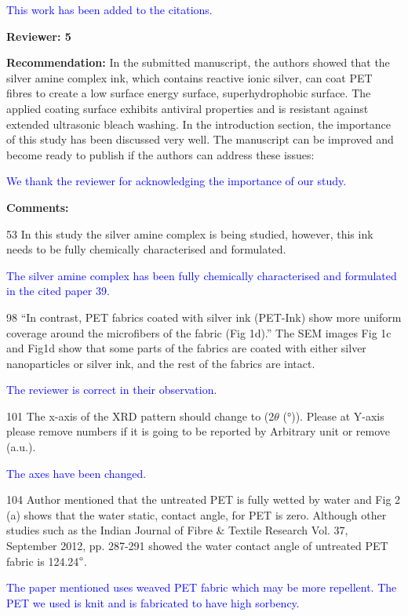 \documentclass[12pt]{letter}
\newcommand{\blue}[1]{\textcolor{blue}{#1}} %
\begin{document}
\blue{This work has been added to the citations. }

\newpage
\textbf{Reviewer: 5}

\textbf{Recommendation:}
In the submitted manuscript, the authors showed that the silver amine complex ink, which contains reactive ionic silver, can coat PET fibres to create a low surface energy surface, superhydrophobic surface. The applied coating surface exhibits antiviral properties and is resistant against extended ultrasonic bleach washing. In the introduction section, the importance of this study has been discussed very well. The manuscript can be improved and become ready to publish if the authors can address these issues:

\blue{We thank the reviewer for acknowledging the importance of our study.}

\textbf{Comments:} 

53 In this study the silver amine complex is being studied, however, this ink needs to be fully chemically characterised and formulated.

\blue{The silver amine complex has been fully chemically characterised and formulated in the cited paper 39.}  %

98 “In contrast, PET fabrics coated with silver ink (PET-Ink) show more uniform coverage around the microfibers of the fabric (Fig 1d).”
The SEM images Fig 1c and Fig1d show that some parts of the fabrics are coated with either silver nanoparticles or silver ink, and the rest of the fabrics are intact.

\blue{The reviewer is correct in their observation.}

101 The x-axis of the XRD pattern should change to (2$\theta$ (°)). Please at Y-axis please remove numbers if it is going to be reported by Arbitrary unit or remove (a.u.).

\blue{The axes have been changed. }

104 Author mentioned that the untreated PET is fully wetted by water and Fig 2 (a) shows that the water static, contact angle, for PET is zero. Although other studies such as the Indian Journal of Fibre \& Textile Research Vol. 37, September 2012, pp. 287-291 showed the water contact angle of untreated PET fabric is 124.24$\degree$.

\blue{The paper mentioned uses weaved PET fabric which may be more repellent. The PET we used is knit and is fabricated to have high sorbency. }
\end{document}
